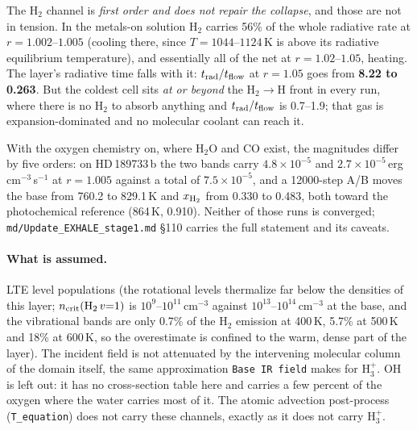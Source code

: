 \documentclass[english,a4paper]{my_memo}
\begin{document}
\noindent The H$_2$ channel is \emph{first order and does not repair the
collapse}, and those are not in tension. In the metals-on solution H$_2$ carries
56\% of the whole radiative rate at $r=1.002$--$1.005$ (cooling there, since
$T=1044$--$1124$\,K is above its radiative equilibrium temperature), and
essentially all of the net at $r=1.02$--$1.05$, heating. The layer's radiative
time falls with it: $t_{\rm rad}/t_{\rm flow}$ at $r=1.05$ goes from
\textbf{8.22 to 0.263}. But the coldest cell sits \emph{at or beyond} the
H$_2\to$H front in every run, where there is no H$_2$ to absorb anything and
$t_{\rm rad}/t_{\rm flow}$ is 0.7--1.9; that gas is expansion-dominated and no
molecular coolant can reach it.

With the oxygen chemistry on, where H$_2$O and CO exist, the magnitudes differ
by five orders: on HD\,189733\,b the two bands carry $4.8\times10^{-5}$ and
$2.7\times10^{-5}$\,erg\,cm$^{-3}$\,s$^{-1}$ at $r=1.005$ against a total of
$7.5\times10^{-5}$, and a 12000-step A/B moves the base from 760.2 to 829.1\,K
and $x_{\rm H_2}$ from 0.330 to 0.483, both toward the photochemical
reference (864\,K, 0.910). Neither of those runs is converged;
\texttt{md/Update\_EXHALE\_stage1.md} \S110 carries the full statement and its
caveats.

\paragraph{What is assumed.}
LTE level populations (the rotational levels thermalize far below the densities
of this layer; $n_{\rm crit}(\mathrm{H_2}\,v{=}1)$ is $10^{9}$--$10^{11}$\,cm$^{-3}$
against $10^{13}$--$10^{14}$\,cm$^{-3}$ at the base, and the vibrational bands
are only 0.7\% of the H$_2$ emission at 400\,K, 5.7\% at 500\,K and 18\% at
600\,K, so the overestimate is confined to the warm, dense part of the layer). The incident field is
not attenuated by the intervening molecular column of the domain itself, the
same approximation \texttt{Base IR field} makes for H$_3^+$. OH is left out: it
has no cross-section table here and carries a few percent of the oxygen where
the water carries most of it. The atomic advection post-process
(\texttt{T\_equation}) does not carry these channels, exactly as it does not
carry H$_3^+$.
\end{document}
